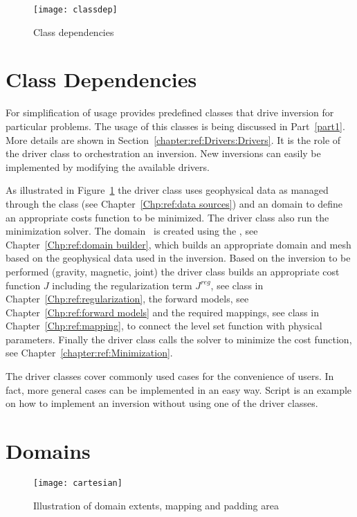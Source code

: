 \begin{figure}[ht]
    \centering\texttt{[image: classdep]}
    \caption{Class dependencies}
    \label{fig:classes}
\end{figure} 

\section{Class Dependencies}
For simplification of usage \downunder provides predefined classes that drive inversion for particular 
problems. The usage of this classes is being discussed in Part~\ref{part1}. More details are shown in
Section~\ref{chapter:ref:Drivers:Drivers}. It is the role of the driver class to orchestration an 
inversion. New inversions can easily be implemented by modifying the available drivers.

As illustrated in Figure~\ref{fig:classes} the driver class uses geophysical data as
managed through the  class (see Chapter~\ref{Chp:ref:data sources}) and 
an \escript domain to define an appropriate
costs function to be minimized. The driver class also run the minimization solver.
The \escript domain~\cite{ESCRIPT} is created using the , see Chapter~\ref{Chp:ref:domain builder},
which builds an appropriate domain and mesh based on the geophysical data used in the inversion. 
Based on the inversion to be performed (gravity, magnetic, joint) the 
driver class builds an appropriate cost function $J$ including the regularization term $J^{reg}$, see
 class in Chapter~\ref{Chp:ref:regularization}, 
the forward models, see Chapter~\ref{Chp:ref:forward models} and
the required mappings, see  class in Chapter~\ref{Chp:ref:mapping},
to connect the level set function with physical parameters. Finally the driver class calls the
solver to minimize the cost function, see Chapter~\ref{chapter:ref:Minimization}.

The driver classes cover commonly used cases for the convenience of users. In fact, 
more general cases can be implemented in an easy way. Script  is an example 
on how to implement an inversion without using one of the driver classes.   


\section{Domains}


\begin{figure}[ht]
    \centering\texttt{[image: cartesian]}
    \caption{Illustration of domain extents, mapping and padding area}
    \label{fig:cartesianDomain}
\end{figure}

